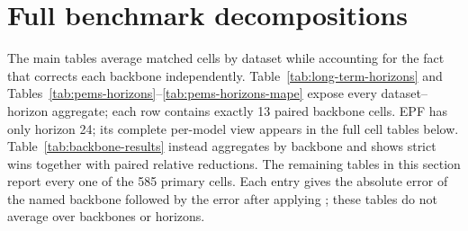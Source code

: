 \section{Full benchmark decompositions}
\label{app:matrix-results}

The main tables average matched cells by dataset while accounting for the
fact that \method{} corrects each backbone independently.
Table~\ref{tab:long-term-horizons} and
Tables~\ref{tab:pems-horizons}--\ref{tab:pems-horizons-mape} expose every
dataset--horizon aggregate; each row contains exactly 13 paired backbone
cells. EPF has only horizon 24; its complete per-model view appears in the
full cell tables below.
Table~\ref{tab:backbone-results} instead aggregates by backbone and shows
strict wins together with paired relative reductions. The remaining tables in
this section report every one of the 585 primary cells. Each entry gives the
absolute error of the named backbone followed by the error after applying
\method{}; these tables do not average over backbones or horizons.


\clearpage

\clearpage

\clearpage


